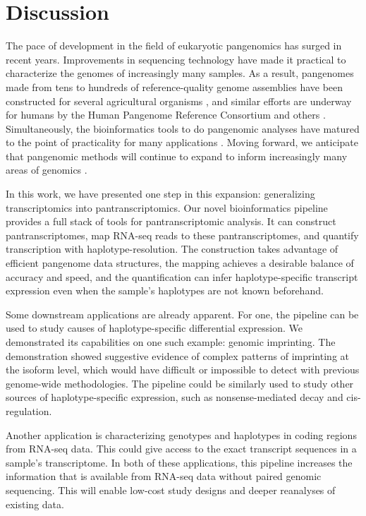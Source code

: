 \documentclass[11pt]{ucthesis}
\begin{document}
\section{Discussion}

The pace of development in the field of eukaryotic pangenomics has surged in recent years. Improvements in sequencing technology have made it practical to characterize the genomes of increasingly many samples. As a result, pangenomes made from tens to hundreds of reference-quality genome assemblies have been constructed for several agricultural organisms \cite{jayakodi2020barley,crysnanto2019accurate,liu2020pan}, and similar efforts are underway for humans by the Human Pangenome Reference Consortium and others \cite{ebert2021haplotype}. Simultaneously, the bioinformatics tools to do pangenomic analyses have matured to the point of practicality for many applications \cite{manuweera2019pangenome,hickey2020genotyping,siren2020genotyping}. Moving forward, we anticipate that pangenomic methods will continue to expand to inform increasingly many areas of genomics \cite{groza2020personalized}.

In this work, we have presented one step in this expansion: generalizing transcriptomics into pantranscriptomics. Our novel bioinformatics pipeline provides a full stack of tools for pantranscriptomic analysis. It can construct pantranscriptomes, map RNA-seq reads to these pantranscriptomes, and quantify transcription with haplotype-resolution. The construction takes advantage of efficient pangenome data structures, the mapping achieves a desirable balance of accuracy and speed, and the quantification can infer haplotype-specific transcript expression even when the sample's haplotypes are not known beforehand.

Some downstream applications are already apparent. For one, the pipeline can be used to study causes of haplotype-specific differential expression. We demonstrated its capabilities on one such example: genomic imprinting. The demonstration showed suggestive evidence of complex patterns of imprinting at the isoform level, which would have difficult or impossible to detect with previous genome-wide methodologies. The pipeline could be similarly used to study other sources of haplotype-specific expression, such as nonsense-mediated decay and cis-regulation. 

Another application is characterizing genotypes and haplotypes in coding regions from RNA-seq data. This could give access to the exact transcript sequences in a sample's transcriptome. In both of these applications, this pipeline increases the information that is available from RNA-seq data without paired genomic sequencing. This will enable low-cost study designs and deeper reanalyses of existing data.
\end{document}
